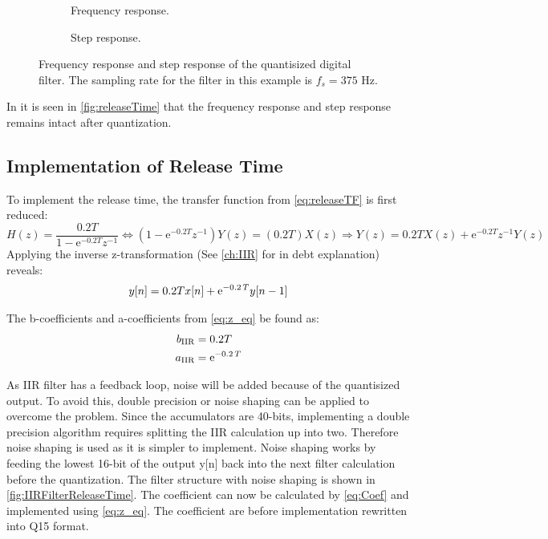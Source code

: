 \begin{figure}[H]
\centering
\begin{subfigure}[t]{0.7\textwidth}
	
	\caption{Frequency response.}
	\label{fig:releaseTimeDigitalFreq}
\end{subfigure}
\begin{subfigure}[t]{0.7\textwidth}
	
	\caption{Step response.}
	\label{fig:releaseTimeDigitalStep}
\end{subfigure}
\caption{Frequency response and step response of the quantisized digital filter. The sampling rate for the filter in this example is $f_s = 375$ Hz.}
\label{fig:releaseTime}
\end{figure}

In it is seen in \autoref{fig:releaseTime} that the frequency response and step response remains intact after quantization.

\subsection*{Implementation of Release Time}

To implement the release time, the transfer function from \autoref{eq:releaseTF} is first reduced:
\begin{equation}
H(z) = \frac{0.2T}{1-\text{e}^{-0.2T} z^{-1}}  \Leftrightarrow (1-\text{e}^{-0.2T} z^{-1})Y(z) = (0.2T)X(z) \Rightarrow Y(z) = 0.2TX(z) + \text{e}^{-0.2T} z^{-1}Y(z)
\end{equation}
Applying the inverse z-transformation (See \autoref{ch:IIR} for in debt explanation) reveals:
\begin{align}
y[n] = 0.2Tx[n] + {\rm e}^{- 0.2\,T}y[n-1]
\label{eq:z_eq}
\end{align}

The b-coefficients and a-coefficients from \autoref{eq:z_eq} be found as:
\begin{align}
b_{\text{IIR}} &= 0.2T \\
a_{\text{IIR}} &= {\rm e}^{- 0.2\,T}
\label{eq:Coef}
\end{align}

As IIR filter has a feedback loop, noise will be added because of the quantisized output. To avoid this, double precision or noise shaping can be applied to overcome the problem. Since the accumulators are 40-bits, implementing a double precision algorithm requires splitting the IIR calculation up into two. Therefore noise shaping is used as it is simpler to implement. Noise shaping works by feeding the lowest 16-bit of the output y[n] back into the next filter calculation before the quantization. The filter structure with noise shaping is shown in \autoref{fig:IIRFilterReleaseTime}. The coefficient can now be calculated by \autoref{eq:Coef} and implemented using \autoref{eq:z_eq}. The coefficient are before implementation rewritten into Q15 format.

